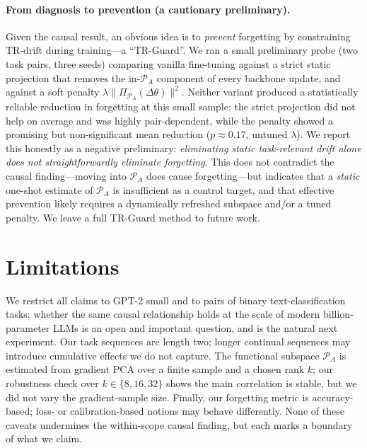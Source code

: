 \documentclass[11pt]{article}
\newcommand{\trdrift}{\mathrm{TR\text{-}drift}}
\newcommand{\PA}{\mathcal{P}_A}
\begin{document}
\paragraph{From diagnosis to prevention (a cautionary preliminary).}
Given the causal result, an obvious idea is to \emph{prevent} forgetting by
constraining $\trdrift$ during training---a ``TR-Guard''. We ran a small
preliminary probe (two task pairs, three seeds) comparing vanilla fine-tuning
against a strict static projection that removes the in-$\PA$ component of every
backbone update, and against a soft penalty
$\lambda\lVert\Pi_{\PA}(\Delta\theta)\rVert^2$. Neither variant produced a
statistically reliable reduction in forgetting at this small sample: the strict
projection did not help on average and was highly pair-dependent, while the
penalty showed a promising but non-significant mean reduction
($p\approx0.17$, untuned $\lambda$). We report this honestly as a negative
preliminary: \emph{eliminating static task-relevant drift alone does not
straightforwardly eliminate forgetting}. This does not contradict the causal
finding---moving into $\PA$ does cause forgetting---but indicates that a
\emph{static} one-shot estimate of $\PA$ is insufficient as a control target,
and that effective prevention likely requires a dynamically refreshed subspace
and/or a tuned penalty. We leave a full TR-Guard method to future work.

\section{Limitations}
\label{sec:limitations}

We restrict all claims to GPT-2 small and to pairs of binary text-classification
tasks; whether the same causal relationship holds at the scale of modern
billion-parameter LLMs is an open and important question, and is the natural
next experiment. Our task sequences are length two; longer continual sequences
may introduce cumulative effects we do not capture. The functional subspace
$\PA$ is estimated from gradient PCA over a finite sample and a chosen rank $k$;
our robustness check over $k\in\{8,16,32\}$ shows the main correlation is stable,
but we did not vary the gradient-sample size. Finally, our forgetting metric is
accuracy-based; loss- or calibration-based notions may behave differently.
None of these caveats undermines the within-scope causal finding, but each marks
a boundary of what we claim.
\end{document}
